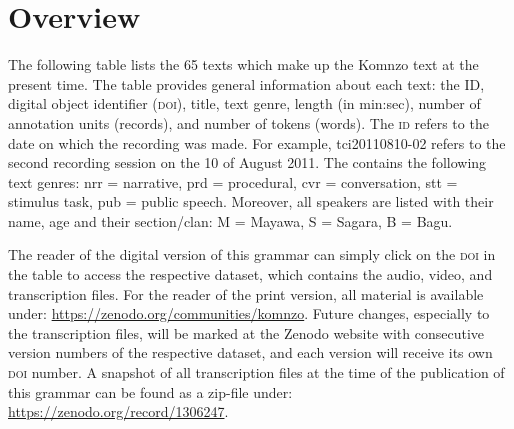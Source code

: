
\appendix
{}

\section*{Overview}\label{corpusov}
	The following table lists the 65 texts which make up the Komnzo text  at the present time. The table provides general information about each text: the  ID, digital object identifier (\textsc{doi}), title, text genre, length (in min:sec), number of annotation units (records), and number of tokens (words). The  \textsc{id} refers to the date on which the recording was made. For example, tci20110810-02 refers to the second recording session on the 10 of August 2011. The  contains the following text genres: nrr = narrative, prd = procedural, cvr = conversation, stt = stimulus task, pub = public speech. Moreover, all speakers are listed with their name, age and their section/clan: M = Mayawa, S = Sagara, B = Bagu.
	
	The reader of the digital version of this grammar can simply click on the \textsc{doi} in the table to access the respective dataset, which contains the audio, video, and transcription files. For the reader of the print version, all material is available under: \href{https://zenodo.org/communities/komnzo}{https://zenodo.org/communities/komnzo}. Future changes, especially to the transcription files, will be marked at the Zenodo website with consecutive version numbers of the respective dataset, and each version will receive its own \textsc{doi} number. A snapshot of all transcription files at the time of the publication of this grammar can be found as a zip-file under: \href{https://zenodo.org/record/1306247}{https://zenodo.org/record/1306247}.	
	
